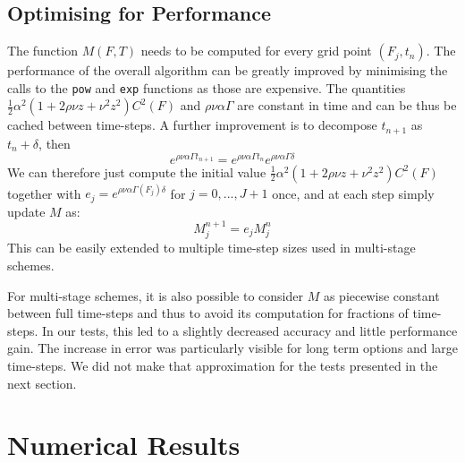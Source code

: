 \documentclass[]{rAMF2e}
\begin{document}
\subsection{Optimising for Performance}
The function $M(F,T)$ needs to be computed for every grid point $\left(F_j, t_n\right)$. The performance of the overall algorithm can be greatly improved by minimising the calls to the \texttt{pow} and \texttt{exp} functions as those are expensive. The quantities $\frac{1}{2} \alpha^2 (1+2\rho\nu z+ \nu^2 z^2) C^2(F)$ and $\rho\nu\alpha\Gamma$ are constant in time and can be thus be cached between time-steps. A further improvement is to decompose $t_{n+1}$ as $t_{n}+\delta$, then 
\begin{equation}
e^{\rho\nu\alpha\Gamma t_{n+1}}=e^{\rho\nu\alpha\Gamma t_n}e^{\rho\nu\alpha\Gamma \delta}
\end{equation}
We can therefore just compute the initial value $\frac{1}{2} \alpha^2 (1+2\rho\nu z+ \nu^2 z^2) C^2(F)$ together with $e_j = e^{\rho\nu\alpha\Gamma(F_j) \delta}$ for $j=0,...,J+1$ once, and at each step simply update $M$ as:
\begin{equation}
M_j^{n+1} = e_j M_j^{n} 
\end{equation}
This can be easily extended to multiple time-step sizes used in multi-stage schemes.

For multi-stage schemes, it is also possible to consider $M$ as piecewise constant between full time-steps and thus to avoid its computation for fractions of time-steps. In our tests, this led to a slightly decreased accuracy and little performance gain. The increase in error was particularly visible for long term options and large time-steps. We did not make that approximation for the tests presented in the next section.

\section{Numerical Results}
\end{document}
